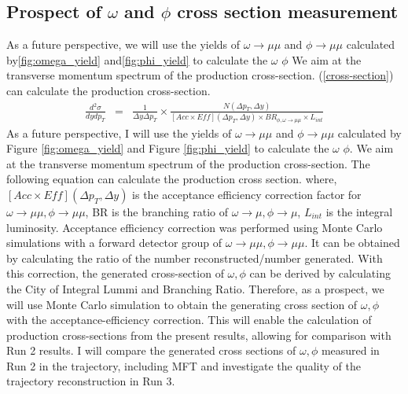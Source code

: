     \subsection{Prospect of $\omega$ and $\phi$ cross section measurement}
        As a future perspective, we will use the yields of $\omega \rightarrow\mu\mu$ and $\phi \rightarrow\mu\mu$ calculated by\ref{fig:omega_yield} and\ref{fig:phi_yield} to calculate the $\omega$ $\phi$ We aim at the transverse momentum spectrum of the production cross-section.
        (\ref{cross-section}) can calculate the production cross-section\cite{phi-crosssection}.
        \begin{eqnarray}
            \frac{d^2\sigma}{dy dp_T} &=& \frac{1}{\Delta y \Delta p_T}\times \frac{N(\Delta p_T,\Delta y)}{[Acc\times Eff](\Delta p_T,\Delta y)\times BR_{\phi,\omega\rightarrow\mu\mu}\times L_{int}}
            \label{cross-section}
        \end{eqnarray}
        As a future perspective, I will use the yields of $\omega \rightarrow\mu\mu$ and $\phi \rightarrow\mu\mu$ calculated by Figure \ref{fig:omega_yield} and Figure \ref{fig:phi_yield} to calculate the $\omega$ $\phi$. We aim at the transverse momentum spectrum of the production cross-section.
        The following equation can calculate the production cross section.
        where,$[Acc \times Eff](\Delta p_T,\Delta y)$ is the acceptance efficiency correction factor for $\omega \rightarrow \mu\mu,\phi \rightarrow \mu\mu$, BR is the branching ratio of $\omega\rightarrow\mu,\phi\rightarrow\mu$, $L_{int}$ is the integral luminosity.
        Acceptance efficiency correction was performed using Monte Carlo simulations with a forward detector group of $\omega\rightarrow\mu\mu,\phi\rightarrow\mu\mu$.
        It can be obtained by calculating the ratio of the number reconstructed/number generated. With this correction, the generated cross-section of $\omega,\phi$ can be derived by calculating the City of Integral Lummi and Branching Ratio. Therefore, as a prospect, we will use Monte Carlo simulation to obtain the generating cross section of $\omega,\phi$ with the acceptance-efficiency correction.
        This will enable the calculation of production cross-sections from the present results, allowing for comparison with Run 2 results. I will compare the generated cross sections of $\omega,\phi$ measured in Run 2 in the trajectory, including MFT and investigate the quality of the trajectory reconstruction in Run 3.

